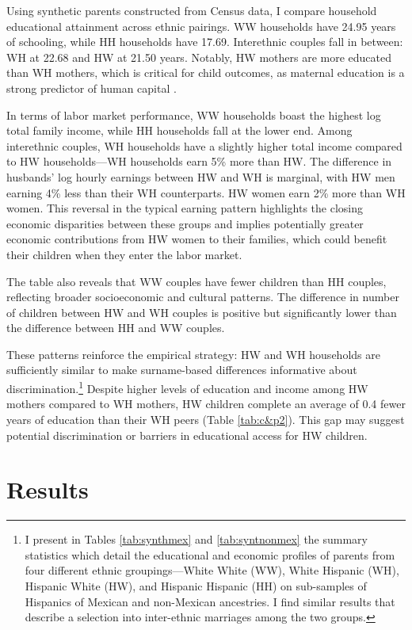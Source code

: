 Using synthetic parents constructed from Census data, I compare household educational attainment across ethnic pairings. WW households have 24.95 years of schooling, while HH households have 17.69. Interethnic couples fall in between: WH at 22.68 and HW at 21.50 years. Notably, HW mothers are more educated than WH mothers, which is critical for child outcomes, as maternal education is a strong predictor of human capital \autocite{gould2020does}.

In terms of labor market performance, WW households boast the highest log total family income, while HH households fall at the lower end.  Among interethnic couples, WH households have a slightly higher total income compared to HW households---WH households earn 5\% more than HW. The difference in husbands’ log hourly earnings between HW and WH is marginal, with HW men earning 4\% less than their WH counterparts. HW women earn 2\% more than WH women. This reversal in the typical earning pattern highlights the closing economic disparities between these groups and implies potentially greater economic contributions from HW women to their families, which could benefit their children when they enter the labor market.

The table also reveals that WW couples have fewer children than HH couples, reflecting broader socioeconomic and cultural patterns. The difference in number of children between HW and WH couples is positive but significantly lower than the difference between HH and WW couples.

These patterns reinforce the empirical strategy: HW and WH households are sufficiently similar to make surname-based differences informative about discrimination.\footnote{I present in Tables \ref{tab:synthmex} and \ref{tab:syntnonmex} the summary statistics which detail the educational and economic profiles of parents from four different ethnic groupings—White White (WW), White Hispanic (WH), Hispanic White (HW), and Hispanic Hispanic (HH) on sub-samples of Hispanics of Mexican and non-Mexican ancestries. I find similar results that describe a selection into inter-ethnic marriages among the two groups.} Despite higher levels of education and income among HW mothers compared to WH mothers, HW children complete an average of 0.4 fewer years of education than their WH peers (Table \ref{tab:c&p2}). This gap may suggest potential discrimination or barriers in educational access for HW children.

\section{Results}\label{sec:results}

